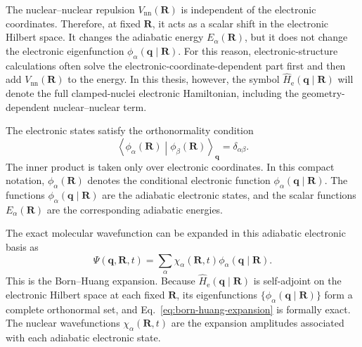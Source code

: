 \documentclass[
  11pt,
  letterpaper,
  onehalfspacing,
  normalmargins,
  equalmargins,
  oneside
]{ut-thesis}
\begin{document}
The nuclear--nuclear repulsion \(V_{\mathrm{nn}}(\mathbf R)\) is independent
of the electronic coordinates. Therefore, at fixed \(\mathbf R\), it acts as a
scalar shift in the electronic Hilbert space. It changes the adiabatic energy
\(E_\alpha(\mathbf R)\), but it does not change the electronic eigenfunction
\(\phi_\alpha(\mathbf q\mid\mathbf R)\). For this reason, electronic-structure
calculations often solve the electronic-coordinate-dependent part first and
then add \(V_{\mathrm{nn}}(\mathbf R)\) to the energy. In this thesis, however,
the symbol \(\hat H_{\mathrm e}(\mathbf q\mid\mathbf R)\) will denote the full
clamped-nuclei electronic Hamiltonian, including the geometry-dependent
nuclear--nuclear term.

The electronic states satisfy the orthonormality condition
\begin{equation}
\left\langle
\phi_\alpha(\mathbf R)
\middle|
\phi_\beta(\mathbf R)
\right\rangle_{\mathbf q}
=
\delta_{\alpha\beta}.
\label{eq:electronic-orthonormality}
\end{equation}
The inner product is taken only over electronic coordinates. In this compact
notation, \(\phi_\alpha(\mathbf R)\) denotes the conditional electronic
function \(\phi_\alpha(\mathbf q\mid\mathbf R)\). The functions
\(\phi_\alpha(\mathbf q\mid\mathbf R)\) are the adiabatic electronic states,
and the scalar functions \(E_\alpha(\mathbf R)\) are the corresponding
adiabatic energies.

The exact molecular wavefunction can be expanded in this adiabatic electronic
basis as \cite{BornHuang1954,Baer2006Book}
\begin{equation}
\Psi(\mathbf q,\mathbf R,t)
=
\sum_{\alpha}
\chi_\alpha(\mathbf R,t)
\phi_\alpha(\mathbf q\mid\mathbf R).
\label{eq:born-huang-expansion}
\end{equation}
This is the Born--Huang expansion. Because \(\hat H_{\mathrm e}(\mathbf q\mid\mathbf R)\) is self-adjoint on the
electronic Hilbert space at each fixed \(\mathbf R\), its eigenfunctions
\(\{\phi_\alpha(\mathbf q\mid\mathbf R)\}\) form a complete orthonormal set,
and Eq.~\eqref{eq:born-huang-expansion} is formally exact. The nuclear wavefunctions \(\chi_\alpha(\mathbf R,t)\) are
the expansion amplitudes associated with each adiabatic electronic state.
\end{document}
